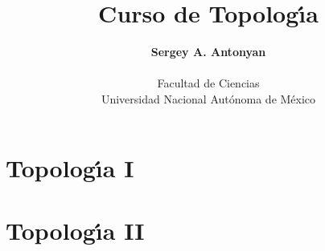 \documentclass[12pt,reqno]{amsbook}
\theoremstyle{Normal}
\theoremstyle{Ejemplos}
\numberwithin{section}{chapter}
\begin{document}
\title{Curso de  Topolog\'\i a }
\author{{\bf Sergey A. Antonyan} \\

\

Facultad de Ciencias\\
Universidad Nacional Aut\'onoma de M\'exico\\
}
 \maketitle \tableofcontents
\part{Topolog\'\i a I}






\part{Topolog\'\i a II}





\printindex
\end{document}
